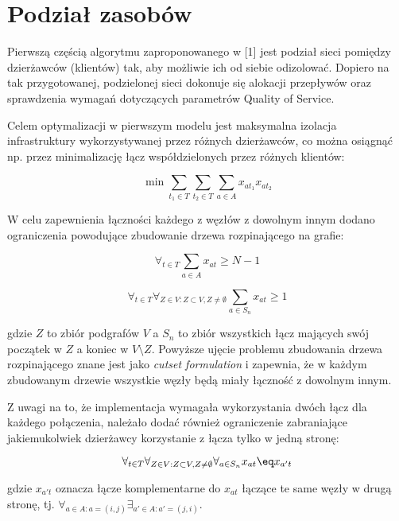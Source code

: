 \section{Podział zasobów}

Pierwszą częścią algorytmu zaproponowanego w [1] jest podział sieci pomiędzy dzierżawców (klientów) tak, aby możliwie ich od siebie odizolować. Dopiero na tak przygotowanej, podzielonej sieci dokonuje się alokacji przepływów oraz sprawdzenia wymagań dotyczących parametrów Quality of Service. \newline

Celem optymalizacji w pierwszym modelu jest maksymalna izolacja infrastruktury wykorzystywanej przez różnych dzierżawców, co można osiągnąć np. przez minimalizację łącz współdzielonych przez różnych klientów:

\begin{equation}
  \min \sum_{t_{1} \in T} \sum_{t_{2} \in T} \sum_{a \in A} x_{at_{1}} x_{at_{2}}
\end{equation}

W celu zapewnienia łączności każdego z węzłów z dowolnym innym dodano ograniczenia powodujące zbudowanie drzewa rozpinającego na grafie:

\begin{equation}
  \forall_{t \in T} \sum_{a \in A} x_{at} \ge N-1
\end{equation}

\begin{equation}
  \forall_{t \in T} \forall_{Z \in V: Z \subset V, Z \neq \emptyset } \sum_{a \in S_{n}} x_{at} \ge 1
\end{equation}

gdzie $Z$ to zbiór podgrafów $V$ a $S_{n}$ to zbiór wszystkich łącz mających swój początek w $Z$ a koniec w $V \setminus Z$. Powyższe ujęcie problemu zbudowania drzewa rozpinającego znane jest jako \textit{cutset formulation} i zapewnia, że w każdym zbudowanym drzewie wszystkie węzły będą miały łączność z dowolnym innym.

Z uwagi na to, że implementacja wymagała wykorzystania dwóch łącz dla każdego połączenia, należało dodać również ograniczenie zabraniające jakiemukolwiek dzierżawcy korzystanie z łącza tylko w jedną stronę:

\begin{equation}
  \forall_{t \in T} \forall_{Z \in V: Z \subset V, Z \neq \emptyset } \forall_{a \in S_{n}} x_{at} \eq x_{a't}
\end{equation}

gdzie $x_{a't}$ oznacza łącze komplementarne do $x_{at}$ łączące te same węzły w drugą stronę, tj. $\forall_{a \in A: a = (i,j)} \exists_{a' \in A: a' = (j,i)}$.
